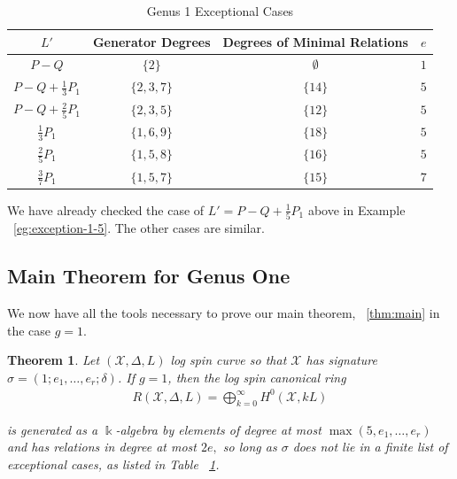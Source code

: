 \documentclass{amsart}
\theoremstyle{plain}
\newtheorem{thm}{Theorem}[section]
\theoremstyle{definition}
\theoremstyle{remark}
\numberwithin{equation}{section}
\newcommand\ssec{\subsection}
\newcommand\Bk{{\Bbbk}}
\newcommand\sx{\mathscr X}
\newcommand{\halfcan}{L}
\begin{document}
\begin{table}	
\begin{tabular}
{| c || c | c | c |}
	\hline
	$\halfcan'$ & Generator Degrees & Degrees of Minimal Relations & $e$ \\
	\hline
	\hline
	$P - Q$ & $\{2\}$ & $\emptyset$ & $1$\\	\hline

	$P - Q + \frac{1}{3} P_1$ & $\{2, 3, 7\}$ & $\{14\}$ & $5$ \\	\hline

	$P - Q + \frac{2}{5} P_1$ & $\{2, 3, 5\}$ & $\{12\}$ & $5$\\	\hline
	
	$\frac{1}{3} P_1$ & $\{1, 6, 9\}$ & $\{18\}$ & $5$ \\	\hline

	$\frac{2}{5} P_1$ & $\{1, 5, 8\}$ & $\{16\}$ & $5$ \\	\hline
	
	$\frac{3}{7} P_1$ & $\{1, 5, 7\}$ & $\{15\}$ & $7$ \\	\hline
\end{tabular}

\caption{Genus 1 Exceptional Cases}
\label{table:g-1-exceptional}
\end{table}

We have already checked the case of 
$L' = P - Q + \frac{1}{5}P_1$ above in Example ~\ref{eg:exception-1-5}. The other cases are similar.

\ssec{Main Theorem for Genus One}
\label{ssec:main_g_1}

We now have all the tools necessary to prove our main theorem, ~\ref{thm:main} in the case $g = 1$. 

\begin{thm}
\label{thm:g-1-main}
Let $(\sx, \Delta, \halfcan)$ log spin curve so that $\sx$ has signature $\sigma = (1; e_1, \ldots, e_r; \delta)$.
If $g = 1$, then the log spin canonical ring
\begin{align*}
	R(\sx, \Delta, \halfcan) = \bigoplus_{k = 0}^\infty H^0(\sx, k L)
\end{align*}

\noindent
is generated as a $\Bk$-algebra by elements of degree at most $\max(5, e_1, \ldots, e_r)$ and has relations in degree at most $2e,$ so long as $\sigma$ does not lie in a
finite list of exceptional cases, as listed in Table
~\ref{table:g-1-exceptional}.
\end{thm}
\end{document}
